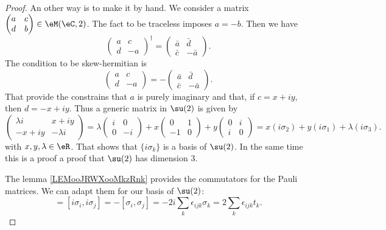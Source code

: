 \begin{proof}
	An other way is to make it by hand. We consider a matrix \( \begin{pmatrix}
		a & c \\
		d & b
	\end{pmatrix}\in \eM(\eC,2)\). The fact to be traceless imposes \( a=-b\). Then we have
	\begin{equation}
		\begin{pmatrix}
			a & c  \\
			d & -a
		\end{pmatrix}^{\dag}=\begin{pmatrix}
			\bar a & \bar d  \\
			\bar c & -\bar a
		\end{pmatrix}.
	\end{equation}
	The condition to be skew-hermitian is
	\begin{equation}
		\begin{pmatrix}
			a & c  \\
			d & -a
		\end{pmatrix}=-\begin{pmatrix}
			\bar a & \bar d  \\
			\bar c & -\bar a
		\end{pmatrix}.
	\end{equation}
	That provide the constrains that \( a\) is purely imaginary and that, if \( c=x+iy\), then \( d=-x+iy\). Thus a generic matrix in \( \su(2)\) is given by
	\begin{equation}
		\begin{pmatrix}
			\lambda i & x+iy       \\
			-x+iy     & -\lambda i
		\end{pmatrix}=\lambda\begin{pmatrix}
			i & 0  \\
			0 & -i
		\end{pmatrix}+x\begin{pmatrix}
			0  & 1 \\
			-1 & 0
		\end{pmatrix}+y\begin{pmatrix}
			0 & i \\
			i & 0
		\end{pmatrix}=x(i\sigma_2)+y(i\sigma_1)+\lambda(i\sigma_3).
	\end{equation}
	with \( x,y,\lambda\in \eR\). That shows that \(  \{ i\sigma_k \} \) is a basis of \( \su(2)\).  In the same time this is a proof a proof that \( \su(2)\) has dimension \( 3\).

	The lemma \ref{LEMooJRWXooMkzRnk} provides the commutators for the Pauli matrices. We can adapt them for our basis of \( \su(2)\):
	\begin{equation}
		[t_i,t_j]=[i\sigma_i , i\sigma_j ]=-[\sigma_i,\sigma_j]=-2i\sum_k\epsilon_{ijk}\sigma_k=2\sum_k\epsilon_{ijk}t_k.
	\end{equation}
\end{proof}

